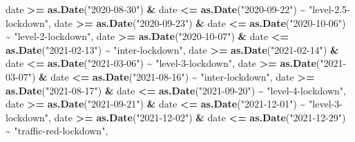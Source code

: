 \documentclass[
]{article}
\newenvironment{Shaded}{\begin{snugshade}}{\end{snugshade}}
\newcommand{\FunctionTok}[1]{\textcolor[rgb]{0.13,0.29,0.53}{\textbf{#1}}}
\newcommand{\NormalTok}[1]{#1}
\newcommand{\SpecialCharTok}[1]{\textcolor[rgb]{0.81,0.36,0.00}{\textbf{#1}}}
\newcommand{\StringTok}[1]{\textcolor[rgb]{0.31,0.60,0.02}{#1}}
\begin{document}
\begin{Shaded}
\begin{Highlighting}[]
\NormalTok{    date }\SpecialCharTok{\textgreater{}=} \FunctionTok{as.Date}\NormalTok{(}\StringTok{"2020{-}08{-}30"}\NormalTok{) }\SpecialCharTok{\&}\NormalTok{ date }\SpecialCharTok{\textless{}=} \FunctionTok{as.Date}\NormalTok{(}\StringTok{"2020{-}09{-}22"}\NormalTok{) }\SpecialCharTok{\textasciitilde{}} \StringTok{"level{-}2.5{-}lockdown"}\NormalTok{,}
\NormalTok{    date }\SpecialCharTok{\textgreater{}=} \FunctionTok{as.Date}\NormalTok{(}\StringTok{"2020{-}09{-}23"}\NormalTok{) }\SpecialCharTok{\&}\NormalTok{ date }\SpecialCharTok{\textless{}=} \FunctionTok{as.Date}\NormalTok{(}\StringTok{"2020{-}10{-}06"}\NormalTok{) }\SpecialCharTok{\textasciitilde{}} \StringTok{"level{-}2{-}lockdown"}\NormalTok{,}
\NormalTok{    date }\SpecialCharTok{\textgreater{}=} \FunctionTok{as.Date}\NormalTok{(}\StringTok{"2020{-}10{-}07"}\NormalTok{) }\SpecialCharTok{\&}\NormalTok{ date }\SpecialCharTok{\textless{}=} \FunctionTok{as.Date}\NormalTok{(}\StringTok{"2021{-}02{-}13"}\NormalTok{) }\SpecialCharTok{\textasciitilde{}} \StringTok{"inter{-}lockdown"}\NormalTok{,}
\NormalTok{    date }\SpecialCharTok{\textgreater{}=} \FunctionTok{as.Date}\NormalTok{(}\StringTok{"2021{-}02{-}14"}\NormalTok{) }\SpecialCharTok{\&}\NormalTok{ date }\SpecialCharTok{\textless{}=} \FunctionTok{as.Date}\NormalTok{(}\StringTok{"2021{-}03{-}06"}\NormalTok{) }\SpecialCharTok{\textasciitilde{}} \StringTok{"level{-}3{-}lockdown"}\NormalTok{,}
\NormalTok{    date }\SpecialCharTok{\textgreater{}=} \FunctionTok{as.Date}\NormalTok{(}\StringTok{"2021{-}03{-}07"}\NormalTok{) }\SpecialCharTok{\&}\NormalTok{ date }\SpecialCharTok{\textless{}=} \FunctionTok{as.Date}\NormalTok{(}\StringTok{"2021{-}08{-}16"}\NormalTok{) }\SpecialCharTok{\textasciitilde{}} \StringTok{"inter{-}lockdown"}\NormalTok{,}
\NormalTok{    date }\SpecialCharTok{\textgreater{}=} \FunctionTok{as.Date}\NormalTok{(}\StringTok{"2021{-}08{-}17"}\NormalTok{) }\SpecialCharTok{\&}\NormalTok{ date }\SpecialCharTok{\textless{}=} \FunctionTok{as.Date}\NormalTok{(}\StringTok{"2021{-}09{-}20"}\NormalTok{) }\SpecialCharTok{\textasciitilde{}} \StringTok{"level{-}4{-}lockdown"}\NormalTok{,}
\NormalTok{    date }\SpecialCharTok{\textgreater{}=} \FunctionTok{as.Date}\NormalTok{(}\StringTok{"2021{-}09{-}21"}\NormalTok{) }\SpecialCharTok{\&}\NormalTok{ date }\SpecialCharTok{\textless{}=} \FunctionTok{as.Date}\NormalTok{(}\StringTok{"2021{-}12{-}01"}\NormalTok{) }\SpecialCharTok{\textasciitilde{}} \StringTok{"level{-}3{-}lockdown"}\NormalTok{,}
\NormalTok{    date }\SpecialCharTok{\textgreater{}=} \FunctionTok{as.Date}\NormalTok{(}\StringTok{"2021{-}12{-}02"}\NormalTok{) }\SpecialCharTok{\&}\NormalTok{ date }\SpecialCharTok{\textless{}=} \FunctionTok{as.Date}\NormalTok{(}\StringTok{"2021{-}12{-}29"}\NormalTok{) }\SpecialCharTok{\textasciitilde{}} \StringTok{"traffic{-}red{-}lockdown"}\NormalTok{,}

\end{Highlighting}
\end{Shaded}
\end{document}

